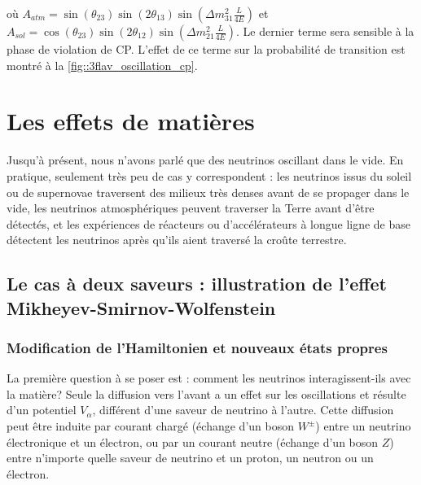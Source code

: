         où $A_{atm} = \sin(\theta_{23})\sin(2\theta_{13})\sin\left(\Delta m^2_{31}\frac{L}{4E}\right)$ et $A_{sol} =\cos(\theta_{23})\sin(2\theta_{12})\sin\left(\Delta m^2_{21}\frac{L}{4E}\right)$. Le dernier terme sera sensible à la phase de violation de CP. L'effet de ce terme sur la probabilité de transition est montré à la \autoref{fig::3flav_oscillation_cp}.
    

  \section{Les effets de matières}\label{sec::matter_effect}
    Jusqu'à présent, nous n'avons parlé que des neutrinos oscillant dans le vide. En pratique, seulement très peu de cas y correspondent : les neutrinos issus du soleil ou de supernovae traversent des milieux très denses avant de se propager dans le vide, les neutrinos atmosphériques peuvent traverser la Terre avant d'être détectés, et les expériences de réacteurs ou d'accélérateurs à longue ligne de base détectent les neutrinos après qu'ils aient traversé la croûte terrestre.
    \subsection{Le cas à deux saveurs : illustration de l'effet Mikheyev-Smirnov-Wolfenstein}
      \subsubsection{Modification de l'Hamiltonien et nouveaux états propres}
        La première question à se poser est : comment les neutrinos interagissent-ils avec la matière? Seule la diffusion vers l'avant a un effet sur les oscillations\cite{Wolfenstein1978,Akhmedov2000} et résulte d'un potentiel $V_{\alpha}$, différent d'une saveur de neutrino à l'autre. Cette diffusion peut être induite par courant chargé (échange d'un boson $W^{\pm}$) entre un neutrino électronique et un électron, ou par un courant neutre (échange d'un boson $Z$) entre n'importe quelle saveur de neutrino et un proton, un neutron ou un électron.

